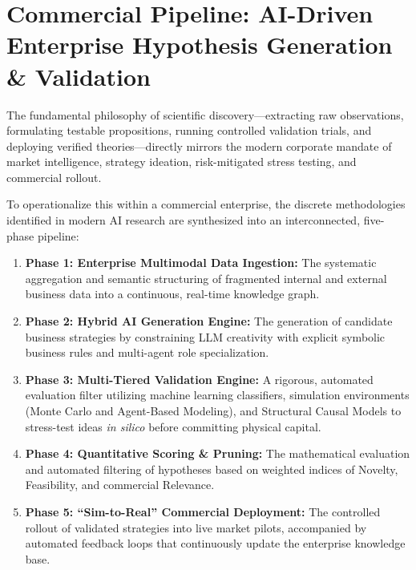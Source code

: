 \documentclass[11pt, a4paper]{article}
\begin{document}
\section{Commercial Pipeline: AI-Driven Enterprise Hypothesis Generation \& Validation}

The fundamental philosophy of scientific discovery---extracting raw observations, formulating testable propositions, running controlled validation trials, and deploying verified theories---directly mirrors the modern corporate mandate of market intelligence, strategy ideation, risk-mitigated stress testing, and commercial rollout. 

To operationalize this within a commercial enterprise, the discrete methodologies identified in modern AI research are synthesized into an interconnected, five-phase pipeline:

\begin{enumerate}[label=\textbf{\arabic*.}, leftmargin=*]
    \item \textbf{Phase 1: Enterprise Multimodal Data Ingestion:} The systematic aggregation and semantic structuring of fragmented internal and external business data into a continuous, real-time knowledge graph.
    
    \item \textbf{Phase 2: Hybrid AI Generation Engine:} The generation of candidate business strategies by constraining LLM creativity with explicit symbolic business rules and multi-agent role specialization.
    
    \item \textbf{Phase 3: Multi-Tiered Validation Engine:} A rigorous, automated evaluation filter utilizing machine learning classifiers, simulation environments (Monte Carlo and Agent-Based Modeling), and Structural Causal Models to stress-test ideas \textit{in silico} before committing physical capital.
    
    \item \textbf{Phase 4: Quantitative Scoring \& Pruning:} The mathematical evaluation and automated filtering of hypotheses based on weighted indices of Novelty, Feasibility, and commercial Relevance.
    
    \item \textbf{Phase 5: ``Sim-to-Real'' Commercial Deployment:} The controlled rollout of validated strategies into live market pilots, accompanied by automated feedback loops that continuously update the enterprise knowledge base.
\end{enumerate}
\end{document}
